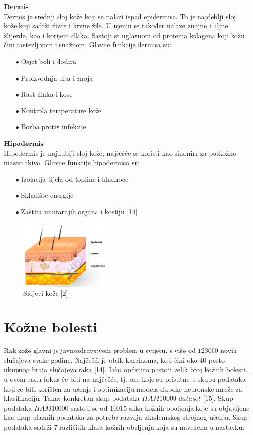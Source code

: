 \documentclass[times, utf8, zavrsni]{fer}
\begin{document}
\textbf{Dermis}\\
\indent{}
Dermis je srednji sloj kože koji se nalazi ispod epidermisa. To je najdeblji sloj kože koji sadrži živce i krvne žile. U njemu se također nalaze znojne i uljne žlijezde, kao i korijeni dlaka. Sastoji se uglavnom od proteina kolagena koji kožu čini rastezljivom i snažnom. Glavne funkcije dermisa su:
\begin{itemize}
\item[$\bullet$] Osjet boli i dodira
\item[$\bullet$] Proizvodnja ulja i znoja
\item[$\bullet$] Rast dlaka i kose
\item[$\bullet$] Kontrola temperature kože
\item[$\bullet$] Borba protiv infekcije
\end{itemize}

\textbf{Hipodermis}\\
\indent{}
Hipodermis je najdublji sloj kože, najčešće se koristi kao sinonim za potkožno masno tkivo. Glavne funkcije hipodermisa su:
\begin{itemize}
\item[$\bullet$] Izolacija tijela od topline i hladnoće
\item[$\bullet$] Skladište energije
\item[$\bullet$] Zaštita unutarnjih organa i kostiju [14]
\end{itemize}
%
\begin{figure}[!h]
\hspace{0.3\textwidth}
\includegraphics[width=0.4\textwidth]{./slike/skin2}
\caption{Slojevi kože [2]}
\label{fig:koza-slojevi}
\end{figure}
%


\section{Kožne bolesti}

Rak kože glavni je javnozdravstveni problem u svijetu, s više od $123000$ novih slučajeva svake godine. Najčešći je oblik karcinoma, koji čini oko $40$ posto ukupnog broja slučajeva raka [14]. Iako općenito postoji velik broj kožnih bolesti, u ovom radu fokus će biti na najčešće, tj. one koje su prisutne u skupu podataka koji će biti korišten za učenje i optimizaciju modela duboke neuronske mreže za klasifikaciju. Takav konkretan skup podataka-$HAM10000$ $dataset$ [15]. Skup podataka $HAM10000$ sastoji se od $10015$ slika kožnih oboljenja koje su objavljene kao skup ulaznih podataka za potrebe razvoja akademskog strojnog učenja. Skup podataka sadrži $7$ različitih klasa kožnih oboljenja koja su navedena u nastavku:
\end{document}
